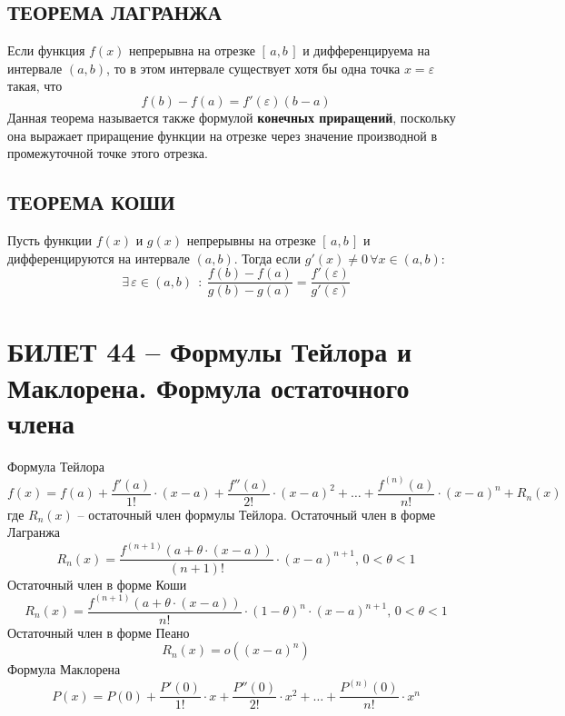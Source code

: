 \documentclass{article}
\begin{document}
\subsection{ТЕОРЕМА ЛАГРАНЖА}
Если функция $f(x)$ непрерывна на отрезке $[\,a,b\,]$ и дифференцируема на интервале $(a,b)$, то в этом интервале существует хотя бы одна точка $x=\varepsilon$ такая, что
$$ f(b)-f(a)=f'(\varepsilon)(b-a) $$
Данная теорема называется также формулой \textbf{конечных приращений}, поскольку она выражает приращение функции на отрезке через значение производной в промежуточной точке этого отрезка. 
\subsection{ТЕОРЕМА КОШИ}
Пусть функции $f(x)$ и $g(x)$ непрерывны на отрезке $[\,a,b\,]$ и дифференцируются на интервале $(a,b)$. Тогда если $g'(x)\neq0\,\forall x\in(a,b): $
$$ \exists \,\varepsilon\in(a,b)\:\::\:\frac{f(b)-f(a)}{g(b)-g(a)}=\frac{f'(\varepsilon)}{g'(\varepsilon)} $$

\newpage
\section{БИЛЕТ 44 -- Формулы Тейлора и Маклорена. Формула остаточного члена}
Формула Тейлора
$$ f(x)=f(a)+\frac{f'(a)}{1!}\cdot(x-a)+\frac{f''(a)}{2!}\cdot(x-a)^2+\ldots+\frac{f^{(n)}(a)}{n!}\cdot(x-a)^n+R_n(x) $$
где $R_n(x)$ -- остаточный член формулы Тейлора.
\newline
Остаточный член в форме Лагранжа
$$ R_n(x)=\frac{f^{(n+1)}(a+\theta\cdot(x-a))}{(n+1)!}\cdot(x-a)^{n+1},\,0<\theta<1 $$
Остаточный член в форме Коши
$$ R_n(x)=\frac{f^{(n+1)}(a+\theta\cdot(x-a))}{n!}\cdot(1-\theta)^n\cdot(x-a)^{n+1},\,0<\theta<1 $$
Остаточный член в форме Пеано
$$ R_n(x)=o((x-a)^n) $$
Формула Маклорена
$$ P(x)=P(0)+\frac{P'(0)}{1!}\cdot x+\frac{P''(0)}{2!}\cdot x^2+\ldots+\frac{P^{(n)}(0)}{n!}\cdot x^n $$
\newpage
\end{document}
